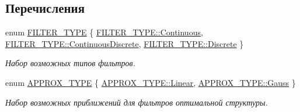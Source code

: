 \subsection*{Перечисления}
\begin{DoxyCompactItemize}
\item 
enum \hyperlink{namespace_core_af88278693f3c866f217da796f4bb9af7}{F\+I\+L\+T\+E\+R\+\_\+\+T\+Y\+PE} \{ \hyperlink{namespace_core_af88278693f3c866f217da796f4bb9af7a535863a82f163709557e59e2eb8139a7}{F\+I\+L\+T\+E\+R\+\_\+\+T\+Y\+P\+E\+::\+Continuous}, 
\hyperlink{namespace_core_af88278693f3c866f217da796f4bb9af7a986671423496acc1540269149da34418}{F\+I\+L\+T\+E\+R\+\_\+\+T\+Y\+P\+E\+::\+Continuous\+Discrete}, 
\hyperlink{namespace_core_af88278693f3c866f217da796f4bb9af7a4984667940802dedc139aa7a430a6553}{F\+I\+L\+T\+E\+R\+\_\+\+T\+Y\+P\+E\+::\+Discrete}
 \}\begin{DoxyCompactList}\small\item\em Набор возможных типов фильтров. \end{DoxyCompactList}
\item 
enum \hyperlink{namespace_core_acd67f53ff1d9b21fabb1da4474a8f7d9}{A\+P\+P\+R\+O\+X\+\_\+\+T\+Y\+PE} \{ \hyperlink{namespace_core_acd67f53ff1d9b21fabb1da4474a8f7d9a32a843da6ea40ab3b17a3421ccdf671b}{A\+P\+P\+R\+O\+X\+\_\+\+T\+Y\+P\+E\+::\+Linear}, 
\hyperlink{namespace_core_acd67f53ff1d9b21fabb1da4474a8f7d9aedc41fb7bf8bdac012523d1bcd949a4f}{A\+P\+P\+R\+O\+X\+\_\+\+T\+Y\+P\+E\+::\+Gauss}
 \}\begin{DoxyCompactList}\small\item\em Набор возможных приближений для фильтров оптимальной структуры. \end{DoxyCompactList}
\end{DoxyCompactItemize}
